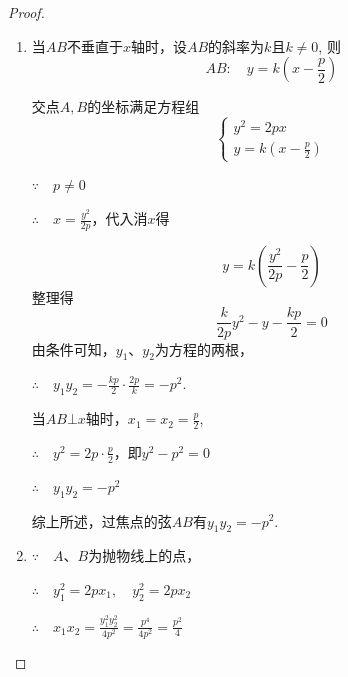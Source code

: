 \begin{proof}
\begin{enumerate}[(1)]
    \item 当$AB$不垂直于$x$轴时，设$AB$的斜率为$k$且$k\ne 0$, 则    
\[AB:\quad y=k\left(x-\frac{p}{2}\right)\]

交点$A,B$的坐标满足方程组
\[\begin{cases}
    y^2=2px\\ y=k\left(x-\frac{p}{2}\right)
\end{cases}\]

$\because\quad p\ne 0$

$\therefore\quad x=\frac{y^2}{2p}$，代入消$x$得


\noindent
\begin{minipage}{.45\textwidth}
\[y=k\left(\frac{y^2}{2p}-\frac{p}{2}\right)\]
整理得
\[\frac{k}{2p}y^2-y-\frac{kp}{2}=0\]
由条件可知，$y_1$、$y_2$为方程的两根，

$\therefore\quad y_1y_2=-\frac{kp}{2}\cdot \frac{2p}{k}=-p^2$.

当$AB\bot x$轴时，$x_1=x_2=\frac{p}{2}$,

$\therefore\quad y^2=2p\cdot \frac{p}{2}$，即$y^2-p^2=0$

$\therefore\quad y_1y_2=-p^2$
\end{minipage}
\hfill
\begin{minipage}{.52\textwidth}
\centering
{}
\end{minipage}

综上所述，过焦点的弦$AB$有$y_1y_2=-p^2$.

\item $\because\quad A$、$B$为抛物线上的点，

$\therefore\quad y^2_1=2px_1,\quad y^2_2=2px_2$

$\therefore\quad x_1x_2=\frac{y^2_1y^2_2}{4p^2}=\frac{p^4}{4p^2}=\frac{p^2}{4}$
\end{enumerate}
\end{proof}

